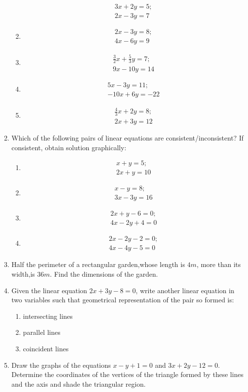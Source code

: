 \documentclass{article}
\theoremstyle{remark}
\begin{document}
\begin{enumerate}
\begin{enumerate}[label=(\roman*)]
\begin{align}
       		3x+2y=5; \\
      		2x-3y=7
    	       \end{align} 
	\item \begin{align}
		2x-3y=8;\\
		4x-6y=9
		\end{align}
	\item \begin{align}
		\frac{3}{2}x+\frac{5}{3}y=7;\\
		9x-10y=14
		\end{align}
\item \begin{align}
		5x-3y=11;\\
		-10x+6y=-22
	\end{align}
\item \begin{align}
         \frac{4}{3}x+2y=8;\\
	  2x+3y=12
	\end{align}
\end{enumerate}
\item Which of the following pairs of linear equations are consistent/inconsistent? If consistent, obtain solution graphically:
\begin{enumerate}[label=(\roman*)]
\item \begin{align}
	x+y=5;\\
	2x+y=10
	\end{align}
\item \begin{align}
	x-y=8;\\
	3x-3y=16
	\end{align}
\item \begin{align}
 	2x+y-6=0;\\
 	4x-2y+4=0
	\end{align}
\item \begin{align}
	2x-2y-2=0;\\
	4x-4y-5=0
	\end{align}
\end{enumerate}
\item Half the perimeter of a rectangular garden,whose length is $4m$, more than its width,is $36m$. Find the dimensions of the garden.
\item Given the linear equation $2x+3y-8=0$, write another linear equation in two variables such that geometrical representation of the pair so formed is:
\begin{enumerate}[label=(\roman*)]
\item intersecting lines
\item parallel lines
\item coincident lines
\end{enumerate}
\item Draw the graphs of the equations $x-y+1=0$ and $3x+2y-12=0$. Determine the coordinates of the vertices of the triangle formed by these lines and the axis and shade the triangular region.
\end{enumerate}
\end{document}
